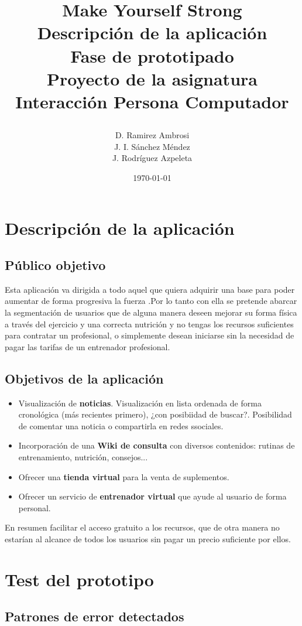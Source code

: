 \documentclass[a4paper]{article}
\date{}
\author{D. Ramirez Ambrosi \\ J. I. Sánchez Méndez \\ J. Rodríguez Azpeleta}
\title{\begin{center}
\textbf{\Huge{Make Yourself Strong}} \\ Descripción de la aplicación \\ Fase de prototipado \\Proyecto de la asignatura Interacción Persona Computador
\end{center}}
\date{\today}
\renewcommand\listfigurename{\centering LISTA DE FIGURAS}
\begin{document}
\maketitle

\thispagestyle{empty}%
\newpage
\tableofcontents%
\thispagestyle{empty}
\newpage





\setcounter{page}{1}%

\section{Descripción de la aplicación}

\subsection{Público objetivo}
Esta aplicación va dirigida a todo aquel que quiera adquirir una base para poder aumentar de 
forma progresiva la fuerza
.Por lo tanto con ella se pretende abarcar la segmentación de usuarios que de alguna manera 
deseen mejorar su forma física a través del ejercicio y una correcta nutrición y no tengas los recursos 
suficientes para contratar un profesional, o simplemente desean iniciarse sin la necesidad de pagar las tarifas
de un entrenador profesional.

\subsection{Objetivos de la aplicación}

\begin{itemize}
	\item	Visualización de \textbf{noticias}. Visualización en lista ordenada de forma cronológica (más recientes primero), ¿con posibiidad de buscar?. Posibilidad de comentar una noticia o compartirla en redes ssociales.
	
	\item	Incorporación de una \textbf{Wiki de consulta} con diversos contenidos: rutinas de entrenamiento, nutrición, consejos...
	
	\item	Ofrecer una \textbf{tienda virtual} para la venta de suplementos.
	
	\item	Ofrecer un servicio de \textbf{entrenador virtual} que ayude al usuario de forma personal.
\end{itemize}

En resumen facilitar el acceso gratuito a los recursos, que de otra manera no estarían al alcance de todos los
usuarios sin pagar un precio suficiente por ellos.

\section{Test del prototipo}

\subsection{Patrones de error detectados}
\end{document}
